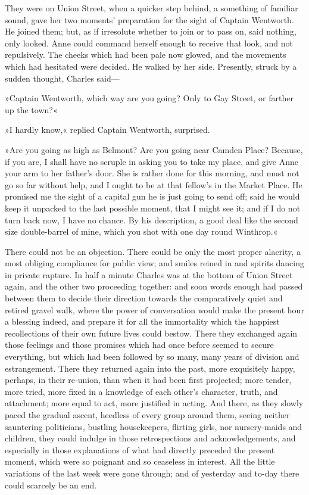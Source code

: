 They were on Union Street, when a quicker step behind, a something of familiar sound, gave her two moments' preparation for the sight of Captain Wentworth. He joined them; but, as if irresolute whether to join or to pass on, said nothing, only looked. Anne could command herself enough to receive that look, and not repulsively. The cheeks which had been pale now glowed, and the movements which had hesitated were decided. He walked by her side. Presently, struck by a sudden thought, Charles said—

»Captain Wentworth, which way are you going? Only to Gay Street, or farther up the town?«

»I hardly know,« replied Captain Wentworth, surprised.

»Are you going as high as Belmont? Are you going near Camden Place? Because, if you are, I shall have no scruple in asking you to take my place, and give Anne your arm to her father's door. She is rather done for this morning, and must not go so far without help, and I ought to be at that fellow's in the Market Place. He promised me the sight of a capital gun he is just going to send off; said he would keep it unpacked to the last possible moment, that I might see it; and if I do not turn back now, I have no chance. By his description, a good deal like the second size double-barrel of mine, which you shot with one day round Winthrop.«

There could not be an objection. There could be only the most proper alacrity, a most obliging compliance for public view; and smiles reined in and spirits dancing in private rapture. In half a minute Charles was at the bottom of Union Street again, and the other two proceeding together: and soon words enough had passed between them to decide their direction towards the comparatively quiet and retired gravel walk, where the power of conversation would make the present hour a blessing indeed, and prepare it for all the immortality which the happiest recollections of their own future lives could bestow. There they exchanged again those feelings and those promises which had once before seemed to secure everything, but which had been followed by so many, many years of division and estrangement. There they returned again into the past, more exquisitely happy, perhaps, in their re-union, than when it had been first projected; more tender, more tried, more fixed in a knowledge of each other's character, truth, and attachment; more equal to act, more justified in acting. And there, as they slowly paced the gradual ascent, heedless of every group around them, seeing neither sauntering politicians, bustling housekeepers, flirting girls, nor nursery-maids and children, they could indulge in those retrospections and acknowledgements, and especially in those explanations of what had directly preceded the present moment, which were so poignant and so ceaseless in interest. All the little variations of the last week were gone through; and of yesterday and to-day there could scarcely be an end.

